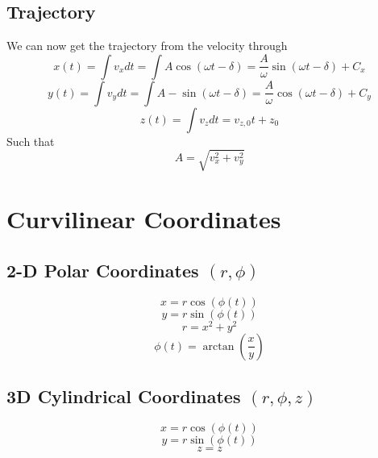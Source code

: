 \documentclass{article}
\newtheorem{one minute paper}[theorem]{One Minute Paper}
\begin{document}
\subsection*{Trajectory}

We can now get the trajectory from the velocity through 
\begin{equation}
    x(t) = \int v_x dt = \int A \cos(\omega t - \delta) = \frac{A}{\omega}\sin(\omega t - \delta) + C_x
\end{equation}
\begin{equation}
    y(t) = \int v_y dt = \int A -\sin(\omega t - \delta) = \frac{A}{\omega}\cos(\omega t - \delta) + C_y
\end{equation}
\begin{equation}
    z(t) = \int v_z dt = v_{z,0}t + z_0
\end{equation}
Such that
\begin{equation}
    A = \sqrt{v_x^2 + v_y^2}
\end{equation}

\section*{Curvilinear Coordinates}

\subsection*{2-D Polar Coordinates $(r, \phi)$}

\begin{equation}
    x = r\cos(\phi(t))
\end{equation}
\begin{equation}
    y = r\sin(\phi(t))
\end{equation}
\begin{equation}
    r = x^2 + y^2
\end{equation}
\begin{equation}
    \phi(t) = \arctan(\frac{x}{y})
\end{equation}

\subsection*{3D Cylindrical Coordinates  $(r, \phi, z)$}

\begin{equation}
    x = r\cos(\phi(t))
\end{equation}
\begin{equation}
    y = r\sin(\phi(t))
\end{equation}
\begin{equation}
    z = z
\end{equation}
\end{document}
